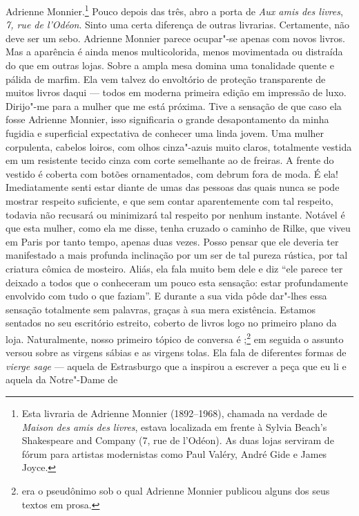 Adrienne Monnier.\footnote{Esta livraria de
  Adrienne Monnier (1892--1968), chamada na verdade de \emph{Maison des
  amis des livres}, estava localizada em frente à Sylvia Beach's
  Shakespeare and Company (7, rue de l'Odéon). As duas lojas serviram
  de fórum para artistas modernistas como Paul Valéry, André Gide e
  James Joyce. \versal{[N.~O.]}} Pouco depois das três, abro a porta de \emph{Aux amis
des livres}, \emph{7, rue de l'Odéon}. Sinto uma certa diferença de
outras livrarias. Certamente, não deve ser um sebo. Adrienne Monnier
parece ocupar"-se apenas com novos livros. Mas a aparência é ainda menos
multicolorida, menos movimentada ou distraída do que em outras lojas.
Sobre a ampla mesa domina uma tonalidade quente e pálida de marfim. Ela vem talvez do envoltório de proteção transparente de muitos livros daqui --- todos em
moderna primeira edição em impressão de luxo. Dirijo"-me para a mulher que me está próxima. Tive a sensação de que caso ela fosse Adrienne Monnier, isso significaria o grande desapontamento da minha fugidia e superficial expectativa de conhecer uma linda jovem. Uma mulher corpulenta, cabelos
loiros, com olhos cinza"-azuis muito claros, totalmente vestida em um
resistente tecido cinza com corte semelhante ao de freiras. A frente do
vestido é coberta com botões ornamentados, com debrum fora de moda. É
ela! Imediatamente senti estar diante de umas das pessoas das quais
nunca se pode mostrar respeito suficiente, e que sem contar
aparentemente com tal respeito, todavia não recusará ou minimizará tal
respeito por nenhum instante. Notável é que esta mulher, como ela me
disse, tenha cruzado o caminho de Rilke, que viveu em Paris por tanto
tempo, apenas duas vezes. Posso pensar que ele deveria ter manifestado a
mais profunda inclinação por um ser de tal pureza rústica, por tal
criatura cômica de mosteiro. Aliás, ela fala muito bem dele e diz ``ele
parece ter deixado a todos que o conheceram um pouco esta sensação:
estar profundamente envolvido com tudo o que faziam''. E durante a sua
vida pôde dar"-lhes essa sensação totalmente sem palavras, graças à sua
mera existência. Estamos sentados no seu escritório estreito, coberto de
livros logo no primeiro plano da loja. Naturalmente, nosso primeiro
tópico de conversa é ;\footnote{ era o pseudônimo sob o
  qual Adrienne Monnier publicou alguns dos seus textos em prosa. \versal{[N.~O.]}} em
seguida o assunto versou sobre as virgens sábias e as virgens tolas. Ela
fala de diferentes formas de \emph{vierge sage} --- aquela de Estrasburgo
que a inspirou a escrever a peça que eu li e aquela da Notre"-Dame de
